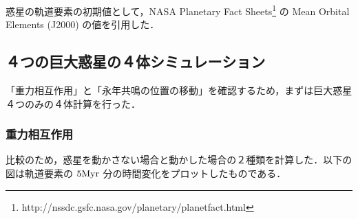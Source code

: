 \documentclass[11pt,a4paper,oneside,onecolumn]{jreport}
\begin{document}
惑星の軌道要素の初期値として，NASA Planetary Fact Sheets\footnote{http://nssdc.gsfc.nasa.gov/planetary/planetfact.html} の Mean Orbital Elements (J2000) の値を引用した．


\subsection{４つの巨大惑星の４体シミュレーション}
「重力相互作用」と「永年共鳴の位置の移動」を確認するため，まずは巨大惑星４つのみの４体計算を行った．
\subsubsection{重力相互作用}
比較のため，惑星を動かさない場合と動かした場合の２種類を計算した．以下の図は軌道要素の $5 {\rm Myr}$ 分の時間変化をプロットしたものである．
\end{document}
